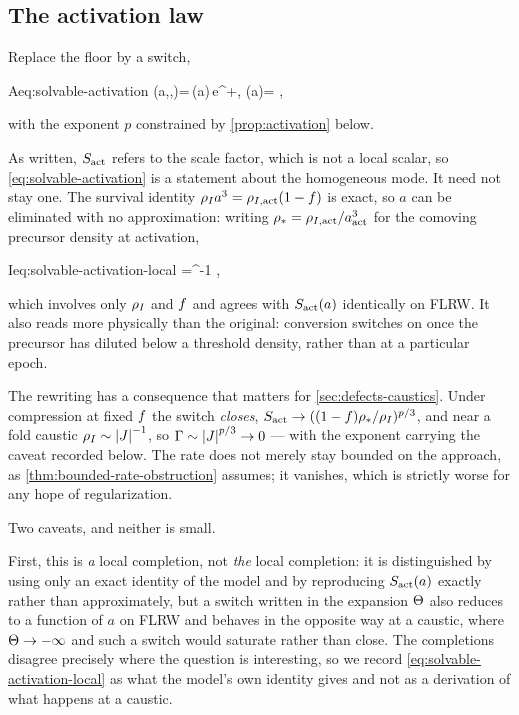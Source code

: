 \subsection{The activation law}\label{sec:solvable-activation}

\begin{assumption}[Activation]\label{asm:activation}
  Replace the floor by a switch,
  \begin{keyresult}{A}{eq:solvable-activation}
    \Gam(a,\fconv,\Mmem)=\Gamz\,\actS(a)\,e^{\alpha \fconv+\beta \Mmem},
    \qquad
    \actS(a)= ,
  \end{keyresult}
  with the exponent $p$ constrained by \cref{prop:activation} below.
\end{assumption}

\begin{remark}
  \label{rem:activation-local}
  As written, $S_{\mathrm{act}}$ refers to the scale factor, which is not a local scalar,
  so \cref{eq:solvable-activation} is a statement about the homogeneous mode.
  It need not stay one. The survival identity $\rho_{I} a^3=\rho_{I,\rm act}(1-f)$
  is exact, so $a$ can be eliminated with no approximation: writing
  $\rho_*=\rho_{I,\rm act}/a_{\mathrm{act}}^3$ for the comoving precursor density at
  activation,
  \begin{keyresult}{I}{eq:solvable-activation-local}
    \actS=^{-1} ,
  \end{keyresult}
  which involves only $\rho_{I}$ and $f$ and agrees with $S_{\mathrm{act}}(a)$
  identically on FLRW. It also reads more physically than the original:
  conversion switches on once the precursor has diluted below a threshold
  density, rather than at a particular epoch.

  The rewriting has a consequence that matters for \cref{sec:defects-caustics}.
  Under compression at fixed $f$ the switch \emph{closes},
  $S_{\mathrm{act}}\to((1-f)\rho_*/\rho_{I})^{p/3}$, and near a fold caustic
  $\rho_{I}\sim\left|J\right|^{-1}$, so $\Gamma\sim\left|J\right|^{p/3}\to0$ --- with the exponent
  carrying the caveat recorded below. The rate does not merely stay bounded on
  the approach, as \cref{thm:bounded-rate-obstruction} assumes; it vanishes,
  which is strictly worse for any hope of regularization.

  Two caveats, and neither is small.

  First, this is \emph{a} local completion, not \emph{the} local completion: it
  is distinguished by using only an exact identity of the model and by
  reproducing $S_{\mathrm{act}}(a)$ exactly rather than approximately, but a switch
  written in the expansion $\Theta$ also reduces to a function of $a$ on FLRW
  and behaves in the opposite way at a caustic, where $\Theta\to-\infty$ and
  such a switch would saturate rather than close. The completions disagree
  precisely where the question is interesting, so we record
  \cref{eq:solvable-activation-local} as what the model's own identity gives
  and not as a derivation of what happens at a caustic.


\end{remark}
